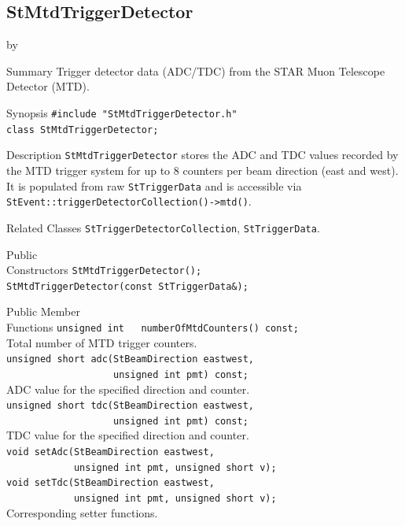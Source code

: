 \documentclass[twoside]{article}
\newcommand{\entrylabel}[1]{\mbox{\textbf{{#1}}}\hfil}%
\newenvironment{entry}
{\begin{list}{}%
    {\renewcommand{\makelabel}{\entrylabel}%
     \setlength{\labelwidth}{90pt}%
     \setlength{\leftmargin}{\labelwidth}
     \advance\leftmargin by \labelsep%
      }%
    }%
  {\end{list}}
\newcommand{\Entrylabel}[1]%
{\raisebox{0pt}[1ex][0pt]{\makebox[\labelwidth][l]%
    {\parbox[t]{\labelwidth}{\hspace{0pt}\textbf{{#1}}}}}}
\newenvironment{Entry}%
{\renewcommand{\entrylabel}{\Entrylabel}\begin{entry}}%
  {\end{entry}}
\begin{document}
\subsection{StMtdTriggerDetector}
\label{sec:StMtdTriggerDetector}
\begin{Entry}
\item[Summary] Trigger detector data (ADC/TDC) from the STAR Muon Telescope
    Detector (MTD).
\item[Synopsis]
    \verb+#include "StMtdTriggerDetector.h"+\\
    \verb+class StMtdTriggerDetector;+\\
\item[Description]
    \texttt{StMtdTriggerDetector} stores the ADC and TDC values recorded by
    the MTD trigger system for up to 8 counters per beam direction (east and
    west).  It is populated from raw \texttt{StTriggerData} and is accessible
    via \verb+StEvent::triggerDetectorCollection()->mtd()+.
\item[Related Classes]
    \texttt{StTriggerDetectorCollection}, \texttt{StTriggerData}.
\item[Public\\ Constructors]
    \verb+StMtdTriggerDetector();+\\
    \verb+StMtdTriggerDetector(const StTriggerData&);+\\
\item[Public Member\\ Functions]
    \verb+unsigned int   numberOfMtdCounters() const;+\\
    Total number of MTD trigger counters.\\
    \verb+unsigned short adc(StBeamDirection eastwest,+\\
    \verb+                   unsigned int pmt) const;+\\
    ADC value for the specified direction and counter.\\
    \verb+unsigned short tdc(StBeamDirection eastwest,+\\
    \verb+                   unsigned int pmt) const;+\\
    TDC value for the specified direction and counter.\\
    \verb+void setAdc(StBeamDirection eastwest,+\\
    \verb+            unsigned int pmt, unsigned short v);+\\
    \verb+void setTdc(StBeamDirection eastwest,+\\
    \verb+            unsigned int pmt, unsigned short v);+\\
    Corresponding setter functions.\\
\end{Entry}
\clearpage
\end{document}
